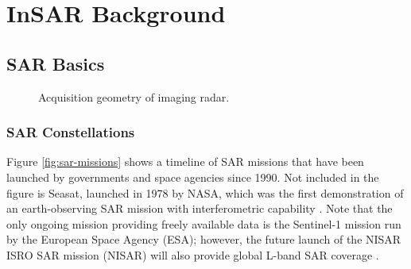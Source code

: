 \documentclass{utexasthesis}
\begin{document}
\chapter{InSAR Background}
\label{CHAP:3}


\section{SAR Basics}
\label{CHAP:3-sar}









\begin{figure}[hbt!]
	\centering
	\caption{Acquisition geometry of imaging radar.
	}
	\label{fig:ch3-sar-geometry}
\end{figure}



\subsection{SAR Constellations}


Figure \ref{fig:sar-missions} shows a timeline of SAR missions that have been launched by governments and space agencies since 1990. Not included in the figure is Seasat, launched in 1978 by NASA, which was the first demonstration of an earth-observing SAR mission with interferometric capability \cite{Born1979SeasatMissionOverview, Gabriel1989MappingSmallElevation}. Note that the only ongoing mission providing freely available data is the Sentinel-1 mission run by the European Space Agency (ESA); however, the future launch of the NISAR ISRO SAR mission (NISAR) will also provide global L-band SAR coverage \cite{Rosen2015NasaIsroSar}.
\end{document}
